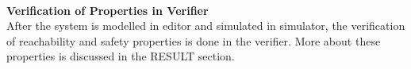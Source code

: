 \documentclass[conference]{IEEEtran}
\begin{document}
\\
\noindent \textbf{Verification of Properties in Verifier}
\\
After the system is modelled in editor and simulated in simulator, the verification of reachability and safety properties is done in the verifier. More about these properties is discussed in the RESULT section.
\\
    





    
    
    
\end{document}
